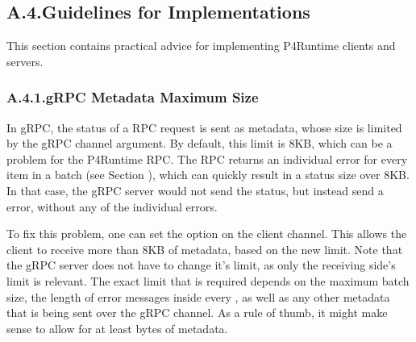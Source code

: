 \documentclass[11pt]{article}
\begin{document}
{%
\subsection{A.4.\hspace*{0.5em}Guidelines for Implementations}\label{sec-guidelines-for-implementations}%

\noindent{}This section contains practical advice for implementing P4Runtime clients and
servers.%

\subsubsection{A.4.1.\hspace*{0.5em}gRPC Metadata Maximum Size}\label{sec-grpc-metadata-maximum-size}%

\noindent{}In gRPC, the status of a RPC request is sent as metadata, whose size is limited
by the  gRPC channel argument.  By default, this limit
is 8KB, which can be a problem for the  P4Runtime RPC.  The  RPC
returns an individual error for every item in a batch (see Section
), which can quickly result in a status size over 8KB.  In that
case, the gRPC server would not send the status, but instead send a
 error, without any of the individual errors.%

To fix this problem, one can set the  option on the
client channel.  This allows the client to receive more than 8KB of metadata,
based on the new limit.  Note that the gRPC server does not have to change it's
limit, as only the receiving side's limit is relevant.  The exact limit that is
required depends on the maximum batch size, the length of error messages inside
every , as well as any other metadata that is being sent over the gRPC
channel.  As a rule of thumb, it might make sense to allow for at least
 bytes of metadata.%

}
\end{document}
